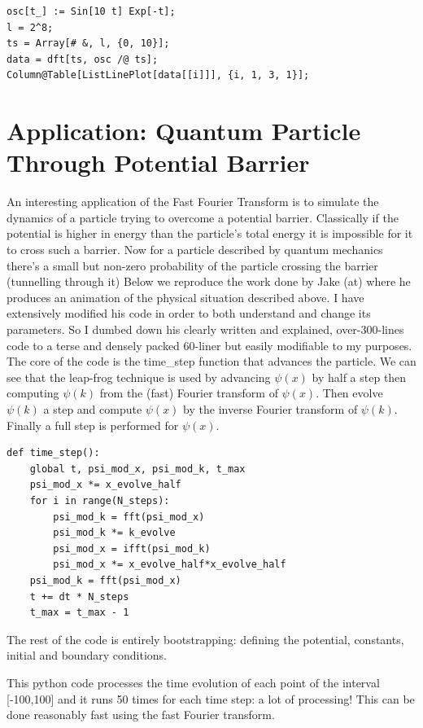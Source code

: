 \documentclass[titlepage]{article}
\begin{document}
\begin{verbatim}
osc[t_] := Sin[10 t] Exp[-t];
l = 2^8;
ts = Array[# &, l, {0, 10}];
data = dft[ts, osc /@ ts];
Column@Table[ListLinePlot[data[[i]]], {i, 1, 3, 1}];
\end{verbatim}

\section{Application: Quantum Particle Through Potential Barrier}

An interesting application of the Fast Fourier Transform is to simulate the dynamics of a particle trying to overcome a potential barrier.
Classically if the potential is higher in energy than the particle's total energy it is impossible for it to cross such a barrier. Now for a particle 
described by quantum mechanics there's a small but non-zero probability of the particle crossing the barrier (tunnelling through it)
Below we reproduce the work done by Jake (at) where he produces an animation of the physical situation described above.
I have extensively modified his code in order to both understand and change its parameters. So I dumbed down his clearly written and explained, over-300-lines code 
to a terse and densely packed 60-liner but easily modifiable to my purposes.
The core of the code is the time\_step function that advances the particle. We can see that the leap-frog technique is used by advancing $\psi(x)$ by half a step
then computing $\psi(k)$ from the (fast) Fourier transform of $\psi(x)$. Then evolve $\psi(k)$ a step and compute $\psi(x)$ by the inverse Fourier transform of $\psi(k)$. Finally a full step is performed for $\psi(x)$.

\begin{verbatim}
def time_step():
    global t, psi_mod_x, psi_mod_k, t_max
    psi_mod_x *= x_evolve_half
    for i in range(N_steps):
        psi_mod_k = fft(psi_mod_x)
        psi_mod_k *= k_evolve
        psi_mod_x = ifft(psi_mod_k)
        psi_mod_x *= x_evolve_half*x_evolve_half
    psi_mod_k = fft(psi_mod_x)
    t += dt * N_steps
    t_max = t_max - 1
\end{verbatim}

The rest of the code is entirely bootstrapping: defining the potential, constants, initial and boundary conditions.

This python code processes the time evolution of each point of the interval [-100,100] and it runs 50 times for each time step: a lot of processing!
This can be done reasonably fast using the fast Fourier transform.
\end{document}
